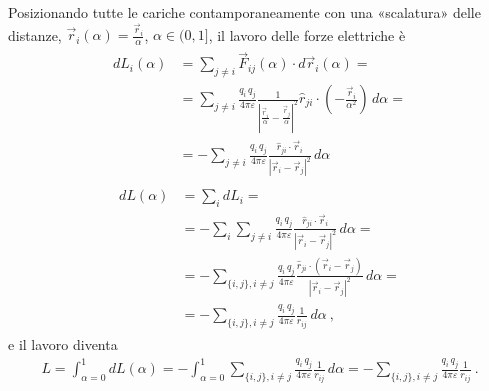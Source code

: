 \documentclass[letterpaper,10pt,italian]{jupyterBook}
\begin{document}
\sphinxAtStartPar
Posizionando tutte le cariche contamporaneamente con una «scalatura» delle distanze, \(\vec{r}_i(\alpha) = \frac{\vec{r}_i}{\alpha}\), \(\alpha \in (0, 1]\), il lavoro delle forze elettriche è
\begin{equation*}
\begin{split}\begin{aligned}
  dL_i(\alpha) & = \sum_{j \ne i} \vec{F}_{ij}(\alpha) \cdot d \vec{r}_i(\alpha) = \\
  & = \sum_{j \ne i} \frac{q_i \, q_j}{4 \pi \varepsilon}  \frac{1}{\left| \frac{\vec{r}_i}{\alpha} - \frac{\vec{r}_j}{\alpha}\right|^2} \hat{r}_{ji} \cdot \left(-\frac{\vec{r}_i}{\alpha^2}\right) \, d \alpha = \\
  & = - \sum_{j \ne i} \frac{q_i \, q_j}{4 \pi \varepsilon}  \frac{\hat{r}_{ji} \cdot\vec{r}_i}{\left| \vec{r}_i - \vec{r}_j\right|^2}  \, d \alpha
\end{aligned}\end{split}
\end{equation*}\begin{equation*}
\begin{split}\begin{aligned}
 dL(\alpha) & = \sum_i d L_i = \\
  & = - \sum_{i} \sum_{j \ne i} \frac{q_i \, q_j}{4 \pi \varepsilon}  \frac{\hat{r}_{ji} \cdot\vec{r}_i}{\left| \vec{r}_i - \vec{r}_j\right|^2}  \, d \alpha = \\
  & = - \sum_{\{i,j\}, i \ne j} \frac{q_i \, q_j}{4 \pi \varepsilon}  \frac{\hat{r}_{ji} \cdot \left( \vec{r}_i - \vec{r}_j \right)}{\left| \vec{r}_i - \vec{r}_j\right|^2}  \, d \alpha = \\
  & = - \sum_{\{i,j\}, i \ne j} \frac{q_i \, q_j}{4 \pi \varepsilon}  \frac{1}{r_{ij}}  \, d \alpha  \ ,
\end{aligned}\end{split}
\end{equation*}
\sphinxAtStartPar
e il lavoro diventa
\begin{equation*}
\begin{split}
 L = \int_{\alpha = 0}^{1} dL (\alpha) =  - \int_{\alpha=0}^{1} \sum_{\{i,j\}, i \ne j} \frac{q_i \, q_j}{4 \pi \varepsilon}  \frac{1}{r_{ij}}  \, d \alpha = - \sum_{\{i,j\}, i \ne j} \frac{q_i \, q_j}{4 \pi \varepsilon}  \frac{1}{r_{ij}} \ .
\end{split}
\end{equation*}\label{ch/electromagnetism/electrostatics:electric-dipole}
\end{document}
